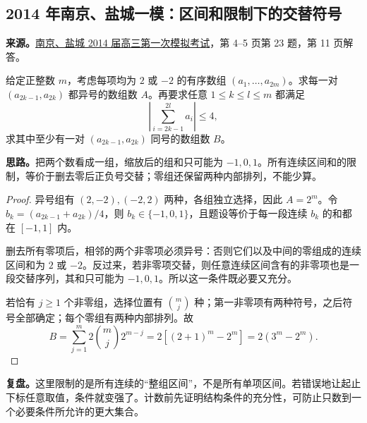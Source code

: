 \documentclass[UTF8,12pt,a4paper,fontset=fandol]{ctexart}
\begin{document}
\subsection{2014 年南京、盐城一模：区间和限制下的交替符号}\label{sec:c2014ny1}
\textbf{来源。}\href{https://www.51wendang.com/doc/b354a966ae74314766a3ac38}{南京、盐城 2014 届高三第一次模拟考试}，第 4--5 页第 23 题，第 11 页解答。
\begin{example}[题意]
给定正整数 $m$，考虑每项均为 $2$ 或 $-2$ 的有序数组 $(a_1,\ldots,a_{2m})$。求每一对 $(a_{2k-1},a_{2k})$ 都异号的数组数 $A$。再要求任意 $1\leq k\leq l\leq m$ 都满足
\[
\left|\sum_{i=2k-1}^{2l}a_i\right|\leq4,
\]
求其中至少有一对 $(a_{2k-1},a_{2k})$ 同号的数组数 $B$。
\end{example}
\textbf{思路。}把两个数看成一组，缩放后的组和只可能为 $-1,0,1$。所有连续区间和的限制，等价于删去零后正负号交替；零组还保留两种内部排列，不能少算。
\begin{proof}
异号组有 $(2,-2),(-2,2)$ 两种，各组独立选择，因此 $A=2^m$。令 $b_k=(a_{2k-1}+a_{2k})/4$，则 $b_k\in\{-1,0,1\}$，且题设等价于每一段连续 $b_k$ 的和都在 $[-1,1]$ 内。

删去所有零项后，相邻的两个非零项必须异号：否则它们以及中间的零组成的连续区间和为 $2$ 或 $-2$。反过来，若非零项交替，则任意连续区间含有的非零项也是一段交替序列，其和只可能为 $-1,0,1$。所以这一条件既必要又充分。

若恰有 $j\geq1$ 个非零组，选择位置有 $\binom mj$ 种；第一非零项有两种符号，之后符号全部确定；每个零组有两种内部排列。故
\[
B=\sum_{j=1}^{m}2\binom mj2^{m-j}
=2\left[(2+1)^m-2^m\right]
=\boxed{2(3^m-2^m)}.
\]
\end{proof}
\textbf{复盘。}这里限制的是所有连续的“整组区间”，不是所有单项区间。若错误地让起止下标任意取值，条件就变强了。计数前先证明结构条件的充分性，可防止只数到一个必要条件所允许的更大集合。
\end{document}

